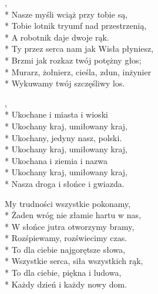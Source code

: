 
\begin{lyrics}[longestline={Murarz, żołnierz, cieśla, zdun, inżynier}]

,\\*
Nasze myśli wciąż przy tobie są,\\*
Tobie lotnik tryumf nad przestrzenią,\\*
A robotnik daje dwoje rąk.\\*
\smallskip
Ty przez serca nam jak Wisła płyniesz,\\*
Brzmi jak rozkaz twój potężny głos;\\*
Murarz, żołnierz, cieśla, zdun, inżynier\\*
Wykuwamy twój szczęśliwy los.

\begin{chorus}
,\\*
Ukochane i miasta i wioski\\*
Ukochany kraj, umiłowany kraj,\\*
Ukochany, jedyny nasz, polski.\\*
Ukochany kraj, umiłowany kraj,\\*
Ukochana i ziemia i nazwa\\*
Ukochany kraj, umiłowany kraj,\\*
Nasza droga i słońce i gwiazda.
\end{chorus}

My trudności wszystkie pokonamy,\\*
Żaden wróg nie złamie hartu w nas,\\*
W słońce jutra otworzymy bramy,\\*
Rozśpiewamy, rozświecimy czas.\\*
\smallskip
To dla ciebie najgorętsze słowa,\\*
Wszystkie serca, siła wszystkich rąk,\\*
To dla ciebie, piękna i ludowa,\\*
Każdy dzień i każdy nowy dom.

\chorusref
\end{lyrics}




